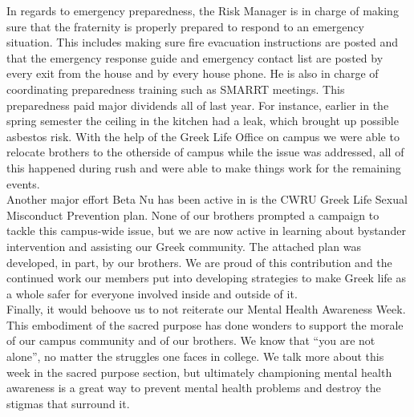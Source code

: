   In regards to emergency preparedness, the Risk Manager is in charge of making sure that the fraternity is properly prepared to respond to an emergency situation. This includes making sure fire evacuation instructions are posted and that the emergency response guide and emergency contact list are posted by every exit from the house and by every house phone. He is also in charge of coordinating preparedness training such as SMARRT meetings. This preparedness paid major dividends all of last year. For instance, earlier in the spring semester the ceiling in the kitchen had a leak, which brought up possible asbestos risk. With the help of the Greek Life Office on campus we were able to relocate brothers to the otherside of campus while the issue was addressed, all of this happened during rush and were able to make things work for the remaining events.\\
  
  Another major effort Beta Nu has been active in is the CWRU Greek Life Sexual Misconduct Prevention plan. None of our brothers prompted a campaign to tackle this campus-wide issue, but we are now active in learning about bystander intervention and assisting our Greek community. The attached plan was developed, in part, by our brothers. We are proud of this contribution and the continued work our members put into developing strategies to make Greek life as a whole safer for everyone involved inside and outside of it. \\

  Finally, it would behoove us to not reiterate our Mental Health Awareness Week. This embodiment of the sacred purpose has done wonders to support the morale of our campus community and of our brothers. We know that ``you are not alone'', no matter the struggles one faces in college. We talk more about this week in the sacred purpose section, but ultimately championing mental health awareness is a great way to prevent mental health problems and destroy the stigmas that surround it. \\
  